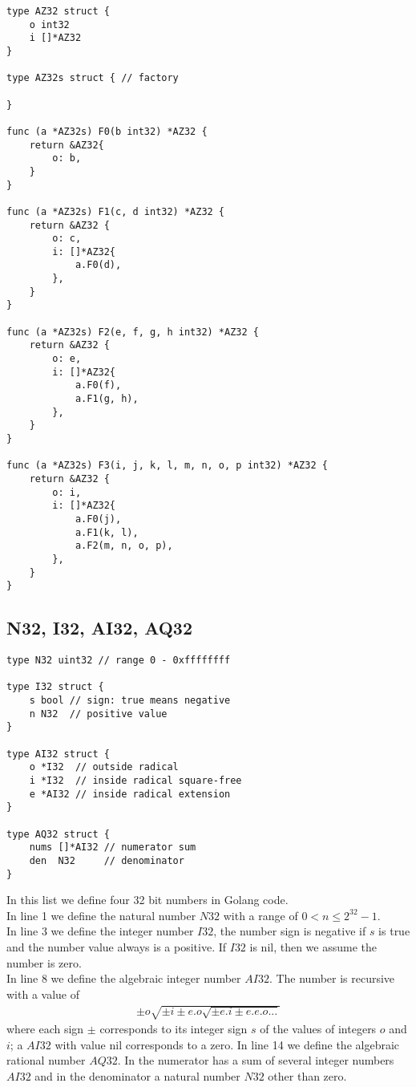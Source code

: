 \documentclass{article}
\begin{document}
\begin{lstlisting}
type AZ32 struct {
	o int32
	i []*AZ32
}

type AZ32s struct { // factory
	
}

func (a *AZ32s) F0(b int32) *AZ32 {
	return &AZ32{
		o: b,
	}
}

func (a *AZ32s) F1(c, d int32) *AZ32 {
	return &AZ32 {
		o: c,
		i: []*AZ32{
			a.F0(d),
		},
	}
}

func (a *AZ32s) F2(e, f, g, h int32) *AZ32 {
	return &AZ32 {
		o: e,
		i: []*AZ32{
			a.F0(f),
			a.F1(g, h),
		},
	}
}

func (a *AZ32s) F3(i, j, k, l, m, n, o, p int32) *AZ32 {
	return &AZ32 {
		o: i,
		i: []*AZ32{
			a.F0(j),
			a.F1(k, l),
			a.F2(m, n, o, p),
		},
	}
}
\end{lstlisting}



\subsection{N32, I32, AI32, AQ32}

\setlength{\columnsep}{30pt}
\begin{multicols}{2}
\begin{lstlisting}
type N32 uint32 // range 0 - 0xffffffff

type I32 struct {
	s bool // sign: true means negative
	n N32  // positive value
}

type AI32 struct {
	o *I32  // outside radical
	i *I32  // inside radical square-free
	e *AI32 // inside radical extension
}

type AQ32 struct {
	nums []*AI32 // numerator sum
	den  N32     // denominator
}
\end{lstlisting}
In this list we define four 32 bit numbers in Golang code.\\
In line 1 we define the natural number $N32$ with a range of $0 < n \leq 2^{32} - 1$.\\
In line 3 we define the integer number $I32$, the number sign is negative if $s$ is true 
and the number value always is a positive. If $I32$ is nil, then we assume the number
is zero.\\
In line 8 we define the algebraic integer number $AI32$. The number is recursive with a value of
\begin{align}
\pm o\sqrt{\pm i \pm e.o\sqrt{\pm e.i \pm e.e.o ... }}
\end{align}
where each sign $\pm$ corresponds to its integer sign $s$ of the values of integers $o$ and $i$;
a $AI32$ with value nil corresponds to a zero.
In line 14 we define the algebraic rational number $AQ32$. In the numerator has a sum of several
integer numbers $AI32$ and in the denominator a natural number $N32$ other than zero.
\end{multicols}
\end{document}
